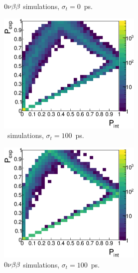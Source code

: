 \begin{figure}[!h]
\begin{subfigure}[t]{0.49\textwidth}
  \captionsetup{justification=justified}
  \caption{$0\nu\beta\beta$ simulations, ${\sigma_{t}=0}$~ps.
    \label{subfig:}}
\end{subfigure}
\begin{subfigure}[t]{0.49\textwidth}
  \centering
  \includegraphics[width=0.76\textwidth]{timedifference/fig_timediff/PintVSPexp_208Tl_100.eps}
  \captionsetup{justification=justified}
  \caption{\Tl\ simulations, ${\sigma_{t}=100}$~ps.
    \label{subfig:}}
\end{subfigure}
\hfill
\begin{subfigure}[t]{0.49\textwidth}
  \centering
  \includegraphics[width=0.76\textwidth]{timedifference/fig_timediff/PintVSPexp_0nubb_100.eps}
  \captionsetup{justification=justified}
  \caption{$0\nu\beta\beta$ simulations, ${\sigma_{t}=100}$~ps.
    \label{subfig:}}
\end{subfigure}
\begin{subfigure}[t]{0.49\textwidth}

\end{subfigure}
\end{figure}
